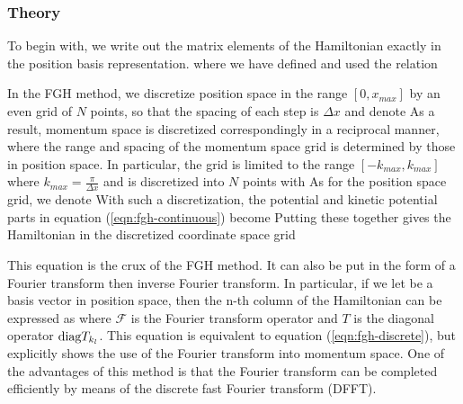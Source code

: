 \documentclass[%
 reprint,
 amsmath,amssymb,
 aps,
 nofootinbib
]{revtex4-1}
\begin{document}
\subsubsection{\label{sec:FGH-theory}Theory}

To begin with, we write out the matrix elements of the Hamiltonian exactly in the position basis representation.
where we have defined 
and used the relation

In the FGH method, we discretize position space in the range $[0,x_{max}]$ by an even grid of $N$ points, so that the spacing of each step is $\Delta x$ and denote
As a result, momentum space is discretized correspondingly in a reciprocal manner, where the range and spacing of the momentum space grid is determined by those in position space. In particular, the grid is limited to the range $[-k_{max},k_{max}]$ where $k_{max} = \frac{\pi}{\Delta x}$ and is discretized into $N$ points with 
As for the position space grid, we denote
With such a discretization, the potential and kinetic potential parts in equation (\ref{eqn:fgh-continuous}) become
Putting these together gives the Hamiltonian in the discretized coordinate space grid

This equation is the crux of the FGH method. It can also be put in the form of a Fourier transform then inverse Fourier transform. In particular, if we let
be a basis vector in position space, then the n-th column of the Hamiltonian can be expressed as
where $\mathcal{F}$ is the Fourier transform operator and $T$ is the diagonal operator $\text{diag}{T_{k_l}}$. This equation is equivalent to equation (\ref{eqn:fgh-discrete}), but explicitly shows the use of the Fourier transform into momentum space. One of the advantages of this method is that the Fourier transform can be completed efficiently by means of the discrete fast Fourier transform (DFFT).
\end{document}
